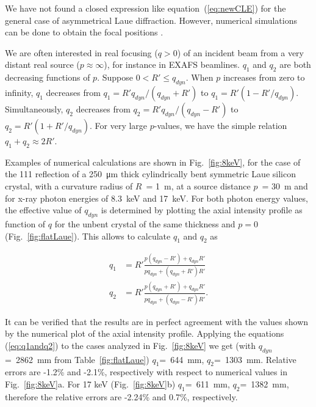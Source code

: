 \documentclass[preprint]{iucr}              %
\begin{document}
We have not found a closed expression like equation~(\ref{eq:newCLE}) for the general case of asymmetrical Laue diffraction. However, numerical simulations can be done to obtain the focal positions \cite{GuigayFerrero2016, Nesterets}.

We are often interested in real focusing ($q>0$) of an incident beam from a very distant real source ($p\approx \infty$), for instance in EXAFS beamlines. $q_1$ and $q_2$ are both decreasing functions of $p$. Suppose $0<R'\le q_{dyn}$. When $p$ increases from zero to infinity, $q_1$ decreases from $q_1=R'q_{dyn}/(q_{dyn}+R')$ to $q_1=R'(1-R'/q_{dyn})$. Simultaneously, $q_2$ decreases from $q_2=R'q_{dyn}/(q_{dyn}-R')$ to $q_2=R'(1+R'/q_{dyn})$. For very large $p$-values, we have the simple relation $q_1+q_2\approx 2R'$.

Examples of numerical calculations are shown in Fig.~\ref{fig:8keV}, for the case of the 111 reflection of a \SI{250}{\micro\meter} thick cylindrically bent symmetric Laue silicon crystal, with a curvature radius of $R$~= \SI{1}{\meter}, at a source distance $p$~= \SI{30}{\meter} and for x-ray photon energies of 8.3~keV and 17~keV. 
For both photon energy values, the effective value of $q_{dyn}$ is determined by plotting the axial intensity profile as function of $q$ for the unbent crystal of the same thickness and $p=0$ (Fig.~\ref{fig:flatLaue}). This allows to calculate $q_1$ and $q_2$ as

\begin{subequations}
\label{eq:q1andq2}
\begin{align}
    q_1 &= R' \frac{p(q_{dyn}-R')+q_{dyn}R'}{p q_{dyn}+(q_{dyn}+R')R'} \\
    q_2 &= R' \frac{p(q_{dyn}+R')+q_{dyn}R'}{p q_{dyn}+(q_{dyn}-R')R'}.
\end{align}
\end{subequations}

It can be verified that the results are in perfect agreement with the values shown by the numerical plot of the axial intensity profile. Applying the equations (\ref{eq:q1andq2})  to the cases analyzed in Fig.~\ref{fig:8keV} we get (with $q_{dyn}$=~\SI{2862}{\milli\meter} from Table~\ref{fig:flatLaue})
$q_1$=~\SI{644}{\milli\meter},
$q_2$=~\SI{1303}{\milli\meter}. Relative errors are -1.2\% and -2.1\%, respectively with respect to numerical values in Fig.~\ref{fig:8keV}a. For 17 keV (Fig.~\ref{fig:8keV}b)
$q_1$=~\SI{611}{\milli\meter},
$q_2$=~\SI{1382}{\milli\meter}, therefore the relative errors are -2.24\% and 0.7\%, respectively.
\end{document}
